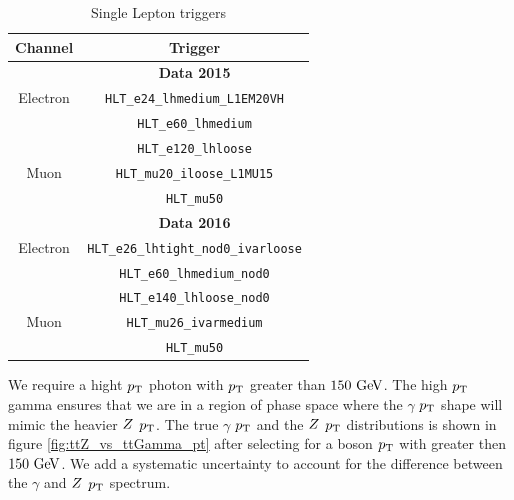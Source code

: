 \begin{table}[htpb]
  \caption{Single Lepton triggers}
  \begin{center}
    \begin{tabular}{c|c} \hline\hline
      Channel & Trigger \\  \hline
              & {\bf Data 2015} \\ \hline
      Electron & \verb+HLT_e24_lhmedium_L1EM20VH+  \\
      	            & \verb+HLT_e60_lhmedium+ \\
	            & \verb+HLT_e120_lhloose+         \\  
      Muon & \verb+HLT_mu20_iloose_L1MU15+ \\
      	       & \verb+HLT_mu50+ \\
      \hline
              & {\bf Data 2016} \\ \hline
      Electron & \verb+HLT_e26_lhtight_nod0_ivarloose+ \\
                     &\verb+HLT_e60_lhmedium_nod0+ \\
                     &\verb+HLT_e140_lhloose_nod0+         \\ 
      Muon & \verb+HLT_mu26_ivarmedium+ \\ 
                & \verb+HLT_mu50+ \\
      \hline \hline
    \end{tabular}
  \end{center}
  \label{tb:lepTriggers}
\end{table}


\indent We require a hight $p_{\mathrm{T}}$ photon with $p_{\mathrm{T}}$ greater than $150\gev$.  The high $p_{\mathrm{T}}$ gamma ensures that we are in a region of phase space where the $\gamma$ $p_{\mathrm{T}}$ shape will mimic the heavier $Z$ $p_{\mathrm{T}}$.  The true $\gamma$ $p_{\mathrm{T}}$ and the $Z$ $p_{\mathrm{T}}$ distributions is shown in figure \ref{fig:ttZ_vs_ttGamma_pt} after selecting for a boson $p_{\mathrm{T}}$ with greater then $150 \gev$.  We add a systematic uncertainty to account for the difference between the $\gamma$ and $Z$ $p_{\mathrm{T}}$ spectrum. \\

